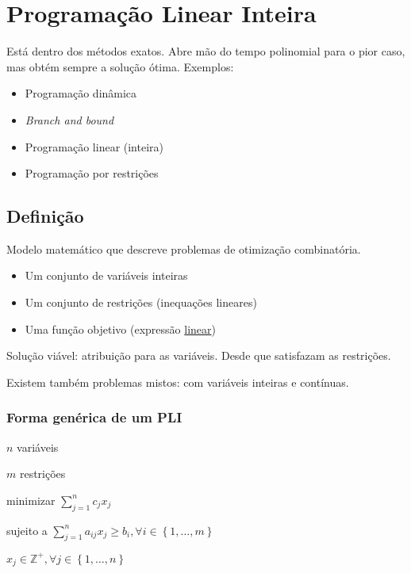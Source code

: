 \chapter{Programação Linear Inteira}

Está dentro dos métodos exatos. Abre mão do tempo polinomial para o pior caso, mas obtém sempre a solução ótima. Exemplos:

\begin{itemize}
    \item Programação dinâmica
    \item \textit{Branch and bound}
    \item Programação linear (inteira)
    \item Programação por restrições
\end{itemize}

\section{Definição}

Modelo matemático que descreve problemas de otimização combinatória.

\begin{itemize}
    \item Um conjunto de variáveis inteiras
    \item Um conjunto de restrições (inequações lineares)
    \item Uma função objetivo (expressão \underline{linear})
\end{itemize}

Solução viável: atribuição para as variáveis. Desde que satisfazam as restrições.

\begin{example}
    Existem também problemas mistos: com variáveis inteiras e contínuas.
\end{example}

\subsection{Forma genérica de um PLI}

\begin{example}
    $n$ variáveis
    
    $m$ restrições
    
    minimizar $\sum_{j=1}^n c_jx_j$
    
    sujeito a $\sum_{j=1}^n a_{ij}x_j\geq b_i, \forall i \in \left\{ 1,\dots , m\right\}$
    
    $x_j \in \mathbb{Z}^+, \forall j \in \left\{ 1, \dots ,n\right\}$
\end{example}

